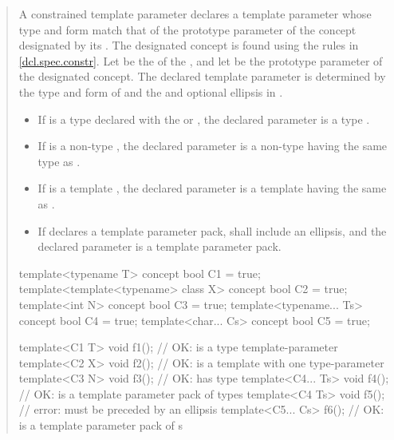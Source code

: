 \begin{quote}
\setcounter{Paras}{8}
\pnum
A constrained template parameter declares a template parameter whose
type and form match that of the prototype parameter of the concept 
designated by its .
The designated concept is found using the rules in
\ref{dcl.spec.constr}. 
% 
Let  be the 
of the ,
and let  be the prototype parameter of the designated
concept. The declared template parameter is determined by the type
and form of  and the 
and optional ellipsis in .
% 
\begin{itemize}
\item If  is a type 
 declared with
the  or , the declared parameter is 
a type . 

\item If  is a non-type 
, the declared
parameter is a non-type 
having the same type as . 

\item If  is a template 
, the declared
parameter is a template 
having the same 
as . 

\item If  declares a template parameter pack,
 shall include an ellipsis, and the declared parameter
is a template parameter pack. 
\end{itemize}
% 
\enterexample
\begin{codeblock}
template<typename T> concept bool C1 = true;
template<template<typename> class X> concept bool C2 = true;
template<int N> concept bool C3 = true;
template<typename... Ts> concept bool C4 = true;
template<char... Cs> concept bool C5 = true;

template<C1 T> void f1();     // OK:  is a type template-parameter
template<C2 X> void f2();     // OK:  is a template with one type-parameter
template<C3 N> void f3();     // OK:  has type 
template<C4... Ts> void f4(); // OK:  is a template parameter pack of types
template<C4 Ts> void f5();    // error:  must be preceded by an ellipsis
template<C5... Cs> f6();      // OK:  is a template parameter pack of s
    \end{codeblock}
    \exitexample
    


\end{quote}
